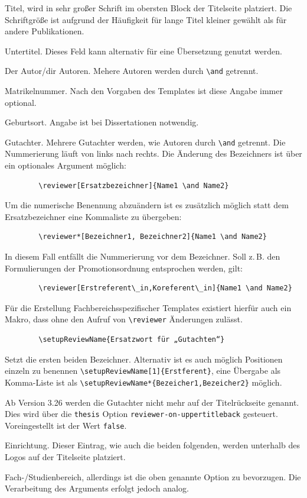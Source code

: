 \documentclass[
	ngerman,
	ruledheaders=chapter,%
	class=book,%
	thesis={
		type=dr,
		dr=rernat
	},
	accentcolor=9c,%
	custommargins=true,%
	marginpar=false,%
	fontsize=11pt,%
]{tudapub}
\begin{document}
\begin{description}
	\item[title] Titel, wird in sehr großer Schrift im obersten Block der Titelseite platziert. Die Schriftgröße ist aufgrund der Häufigkeit für lange Titel kleiner gewählt als für andere Publikationen.
	\item[subtitle] Untertitel. Dieses Feld kann alternativ für eine Übersetzung genutzt werden.
	\item[author] Der Autor/dir Autoren. Mehere Autoren werden durch \verb+\and+ getrennt.
	\item[studentID] Matrikelnummer. Nach den Vorgaben des Templates ist diese Angabe immer optional.
	\item[birthplace] Geburtsort. Angabe ist bei Dissertationen notwendig.
	\item[reviewer] Gutachter. Mehrere Gutachter werden, wie Autoren durch \verb+\and+ getrennt. Die Nummerierung läuft von links nach rechts.
	Die Änderung des Bezeichners ist über ein optionales Argument möglich:
	\begin{verbatim}
		\reviewer[Ersatzbezeichner]{Name1 \and Name2}
	\end{verbatim}
	Um die numerische Benennung abzuändern ist es zusätzlich möglich statt dem Ersatzbezeichner eine Kommaliste zu übergeben:
	\begin{verbatim}
		\reviewer*[Bezeichner1, Bezeichner2]{Name1 \and Name2}
	\end{verbatim}
	In diesem Fall entfällt die Nummerierung vor dem Bezeichner. Soll z.\,B. den Formulierungen der Promotionsordnung entsprochen werden, gilt:
	\begin{verbatim}
		\reviewer[Erstreferent\_in,Koreferent\_in]{Name1 \and Name2}
	\end{verbatim}
	Für die Erstellung Fachbereichsspezifischer Templates existiert hierfür auch ein Makro, dass ohne den Aufruf von \verb+\reviewer+ Änderungen zulässt.
	\begin{verbatim}
		\setupReviewName{Ersatzwort für „Gutachten“}
	\end{verbatim}
	Setzt die ersten beiden Bezeichner. Alternativ ist es auch möglich Positionen einzeln zu benennen \verb+\setupReviewName[1]{Erstferent}+, eine Übergabe als Komma-Liste ist als \verb+\setupReviewName*{Bezeicher1,Bezeicher2}+ möglich.

	Ab Version 3.26 werden die Gutachter nicht mehr auf der Titelrückseite genannt. Dies wird über die \verb+thesis+ Option \verb+reviewer-on-uppertitleback+ gesteuert. Voreingestellt ist der Wert \verb+false+.
	\item[institution] Einrichtung. Dieser Eintrag, wie auch die beiden folgenden, werden unterhalb des Logos auf der Titelseite platziert.
	\item[department] Fach-/Studienbereich, allerdings ist die oben genannte Option zu bevorzugen. Die Verarbeitung des Arguments erfolgt jedoch analog.


\end{description}
\end{document}
